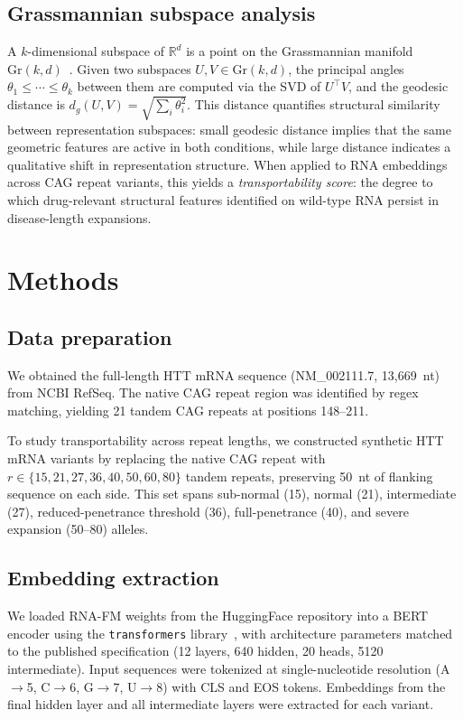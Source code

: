 \documentclass[11pt]{article}
\newcommand{\Gr}{\mathrm{Gr}}
\newcommand{\R}{\mathbb{R}}
\begin{document}
\subsection{Grassmannian subspace analysis}

A $k$-dimensional subspace of $\R^d$ is a point on the Grassmannian
manifold $\Gr(k, d)$~\citep{edelman1998}. Given two subspaces
$U, V \in \Gr(k, d)$, the principal angles
$\theta_1 \leq \cdots \leq \theta_k$ between them are computed via the
SVD of $U^\top V$, and the geodesic distance is
$d_g(U, V) = \sqrt{\sum_i \theta_i^2}$.
%
This distance quantifies structural similarity between representation
subspaces: small geodesic distance implies that the same geometric
features are active in both conditions, while large distance indicates
a qualitative shift in representation structure.
%
When applied to RNA embeddings across CAG repeat variants, this yields
a \emph{transportability score}: the degree to which drug-relevant
structural features identified on wild-type RNA persist in disease-length
expansions.


\section{Methods}
\label{sec:methods}

\subsection{Data preparation}

We obtained the full-length HTT mRNA sequence (NM\_002111.7,
13{,}669~nt) from NCBI RefSeq. The native CAG repeat region was
identified by regex matching, yielding 21 tandem CAG repeats at
positions 148--211.

To study transportability across repeat lengths, we constructed
synthetic HTT mRNA variants by replacing the native CAG repeat with
$r \in \{15, 21, 27, 36, 40, 50, 60, 80\}$ tandem repeats, preserving
50~nt of flanking sequence on each side. This set spans
sub-normal (15), normal (21), intermediate (27), reduced-penetrance
threshold (36), full-penetrance (40), and severe expansion (50--80)
alleles.

\subsection{Embedding extraction}

We loaded RNA-FM weights from the HuggingFace
repository into a BERT encoder using the
\texttt{transformers} library~\citep{wolf2020transformers}, with
architecture parameters matched to the published
specification (12 layers, 640 hidden, 20 heads, 5120 intermediate).
%
Input sequences were tokenized at single-nucleotide resolution
(A$\to$5, C$\to$6, G$\to$7, U$\to$8) with CLS and EOS tokens.
Embeddings from the final hidden layer and all intermediate layers
were extracted for each variant.
\end{document}
